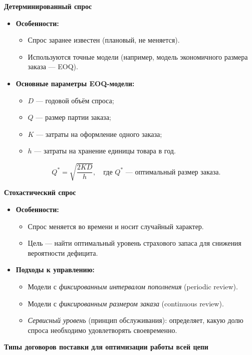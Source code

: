 \textbf{Детерминированный спрос}
\begin{itemize}
    \item \textbf{Особенности:}
    \begin{itemize}
        \item Спрос заранее известен (плановый, не меняется).
        \item Используются точные модели (например, модель экономичного размера заказа --- EOQ).
    \end{itemize}
    \item \textbf{Основные параметры EOQ-модели:}
    \begin{itemize}
        \item $D$ --- годовой объём спроса;
        \item $Q$ --- размер партии заказа;
        \item $K$ --- затраты на оформление одного заказа;
        \item $h$ --- затраты на хранение единицы товара в год.
    \end{itemize}
    \[
        Q^* = \sqrt{\frac{2KD}{h}}, 
        \quad 
        \text{где } Q^* \text{ --- оптимальный размер заказа.}
    \]
\end{itemize}

\textbf{Стохастический спрос}
\begin{itemize}
    \item \textbf{Особенности:}
    \begin{itemize}
        \item Спрос меняется во времени и носит случайный характер.
        \item Цель --- найти оптимальный уровень страхового запаса для снижения вероятности дефицита.
    \end{itemize}
    \item \textbf{Подходы к управлению:}
    \begin{itemize}
        \item Модели с \textit{фиксированным интервалом пополнения} (periodic review).
        \item Модели с \textit{фиксированным размером заказа} (continuous review).
        \item \textit{Сервисный уровень} (принцип обслуживания): определяет, какую долю спроса необходимо удовлетворять своевременно.
    \end{itemize}
\end{itemize}

\textbf{Типы договоров поставки для оптимизации работы всей цепи}

